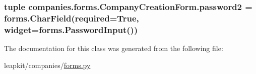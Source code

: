 \hypertarget{classcompanies_1_1forms_1_1_company_creation_form_ae4fcc277e1e2186f8da1b064cfb44b9c}{
\subsubsection[{password2}]{\setlength{\rightskip}{0pt plus 5cm}tuple companies.\-forms.\-Company\-Creation\-Form.\-password2 = forms.\-Char\-Field(required=True, {\bf widget}=forms.\-Password\-Input())\hspace{0.3cm}{\ttfamily [static]}}}\label{classcompanies_1_1forms_1_1_company_creation_form_ae4fcc277e1e2186f8da1b064cfb44b9c}


The documentation for this class was generated from the following file\-:\begin{DoxyCompactItemize}
\item 
leapkit/companies/\hyperlink{companies_2forms_8py}{forms.\-py}\end{DoxyCompactItemize}
